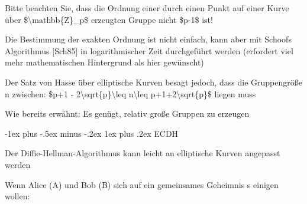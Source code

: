 \documentclass[a4paper]{article}
\makeatletter
\renewcommand{\subsubsection}{\@startsection{subsubsection}{3}{0mm}%
 {-1ex plus -.5ex minus -.2ex}%
 {1ex plus .2ex}%
 {\normalfont\small\bfseries}}
\makeatother
\begin{document}
\begin{multicols}{3}
      \begin{itemize*}
            \item
            Bitte beachten Sie, dass die Ordnung einer durch einen Punkt auf einer
            Kurve über \$\textbackslash mathbb\{Z\}\_p\$ erzeugten Gruppe nicht
            \$p-1\$ ist!
            \item
            Die Bestimmung der exakten Ordnung ist nicht einfach, kann aber mit
            Schoofs Algorithmus {[}Sch85{]} in logarithmischer Zeit durchgeführt
            werden (erfordert viel mehr mathematischen Hintergrund als hier
            gewünscht)
            \item
            Der Satz von Hasse über elliptische Kurven besagt jedoch, dass die
            Gruppengröße n zwischen: \$p+1 -
            2\textbackslash sqrt\{p\}\textbackslash leq n\textbackslash leq
            p+1+2\textbackslash sqrt\{p\}\$ liegen muss
            \item
            Wie bereits erwähnt: Es genügt, relativ große Gruppen zu erzeugen
      \end{itemize*}


      \subsubsection{ECDH}

      \begin{itemize*}
            \item
            Der Diffie-Hellman-Algorithmus kann leicht an elliptische Kurven
            angepasst werden
            \item
            Wenn Alice (A) und Bob (B) sich auf ein gemeinsames Geheimnis s
            einigen wollen:


\end{itemize*}
\end{multicols}
\end{document}
